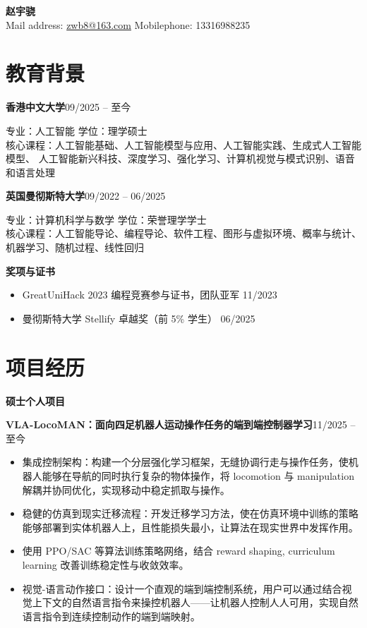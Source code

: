 \documentclass[a4paper,10pt]{article}
\newcommand{\entry}[2]{%
  \noindent\textbf{#1}\hfill#2\par%
}
\begin{document}
\begin{center}
  {\LARGE\bfseries 赵宇骁}\\[5pt]
  Mail address: \href{mailto:zwb8@163.com}{zwb8@163.com}
  \quad\textbar\quad
  Mobilephone: 13316988235
\end{center}

\vspace{4pt}

\section*{教育背景}

\entry{香港中文大学}{09/2025 -- 至今}
专业：人工智能 \quad 学位：理学硕士\\
核心课程：人工智能基础、人工智能模型与应用、人工智能实践、生成式人工智能模型、
人工智能新兴科技、深度学习、强化学习、计算机视觉与模式识别、语音和语言处理

\vspace{5pt}

\entry{英国曼彻斯特大学}{09/2022 -- 06/2025}
专业：计算机科学与数学 \quad 学位：荣誉理学学士\\
核心课程：人工智能导论、编程导论、软件工程、图形与虚拟环境、概率与统计、
机器学习、随机过程、线性回归

\vspace{5pt}

\noindent\textbf{奖项与证书}
\begin{itemize}
  \item GreatUniHack 2023 编程竞赛参与证书，团队亚军 \hfill 11/2023
  \item 曼彻斯特大学 Stellify 卓越奖（前 5\% 学生） \hfill 06/2025
\end{itemize}

\section*{项目经历}

\noindent\textbf{硕士个人项目}

\vspace{3pt}
\entry{VLA-LocoMAN：面向四足机器人运动操作任务的端到端控制器学习}{11/2025 -- 至今}
\begin{itemize}
  \item 集成控制架构：构建一个分层强化学习框架，无缝协调行走与操作任务，使机器人能够在导航的同时执行复杂的物体操作，将 locomotion 与 manipulation 解耦并协同优化，实现移动中稳定抓取与操作。
  \item 稳健的仿真到现实迁移流程：开发迁移学习方法，使在仿真环境中训练的策略能够部署到实体机器人上，且性能损失最小，让算法在现实世界中发挥作用。
  \item 使用 PPO/SAC 等算法训练策略网络，结合 reward shaping, curriculum learning 改善训练稳定性与收敛效率。
  \item 视觉-语言动作接口：设计一个直观的端到端控制系统，用户可以通过结合视觉上下文的自然语言指令来操控机器人——让机器人控制人人可用，实现自然语言指令到连续控制动作的端到端映射。
\end{itemize}
\end{document}
